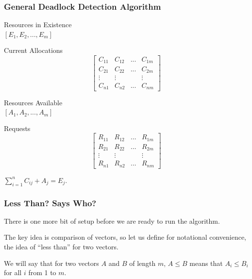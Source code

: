 \begin{frame}
\frametitle{General Deadlock Detection Algorithm}

\begin{multicols}{2}
\begin{center}
\textsf{Resources in Existence}\\
$[E_{1}, E_{2}, ..., E_{m}]$\vspace{5em}

\textsf{Current Allocations}
\[
\left[ {\begin{array}{cccc}
C_{11} & C_{12} & ... & C_{1m} \\
C_{21} & C_{22} & ... & C_{2m} \\
\vdots & \vdots &     & \vdots \\
C_{n1} & C_{n2} & ... & C_{nm}
\end{array} } \right]
\]
\end{center}
\columnbreak

\begin{center}
\textsf{Resources Available}\\
$[A_{1}, A_{2}, ..., A_{m}]$\vspace{3em}

\textsf{Requests}
\[
\left[ {\begin{array}{cccc}
R_{11} & R_{12} & ... & R_{1m} \\
R_{21} & R_{22} & ... & R_{2m} \\
\vdots & \vdots &     & \vdots \\
R_{n1} & R_{n2} & ... & R_{nm}
\end{array} } \right]
\]
\end{center}

\end{multicols}

\begin{center}
$\sum\limits_{i=1}^n C_{ij} + A_{j} = E_{j}$.
\end{center}


\end{frame}

\begin{frame}
\frametitle{Less Than? Says Who?}

There is one more bit of setup before we are ready to run the algorithm. 

The key idea is comparison of vectors, so let us define for notational convenience, the idea of ``less than'' for two vectors.

We will say that for two vectors $A$ and $B$ of length $m$,  $A \leq B$ means that $A_{i} \leq B_{i}$ for all $i$ from 1 to $m$.

\end{frame}

